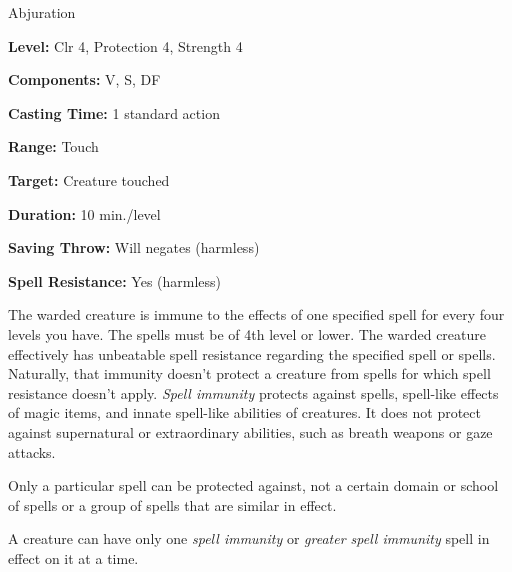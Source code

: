 
Abjuration

\textbf{Level:} Clr 4, Protection 4, Strength 4

\textbf{Components:} V, S, DF

\textbf{Casting Time:} 1 standard action

\textbf{Range:} Touch

\textbf{Target:} Creature touched

\textbf{Duration:} 10 min./level

\textbf{Saving Throw:} Will negates (harmless)

\textbf{Spell Resistance:} Yes (harmless)

The warded creature is immune to the effects of one specified spell for every four 
levels you have. The spells must be of 4th level or lower. The warded creature 
effectively has unbeatable spell resistance regarding the specified spell or spells. 
Naturally, that immunity doesn't protect a creature from spells for which spell 
resistance doesn't apply. \textit{Spell immunity} protects against spells, spell-like 
effects of magic items, and innate spell-like abilities of creatures. It does not 
protect against supernatural or extraordinary abilities, such as breath weapons 
or gaze attacks.

Only a particular spell can be protected against, not a certain domain or school 
of spells or a group of spells that are similar in effect. 

A creature can have only one \textit{spell immunity} or \textit{greater spell immunity 
}spell in effect on it at a time.

